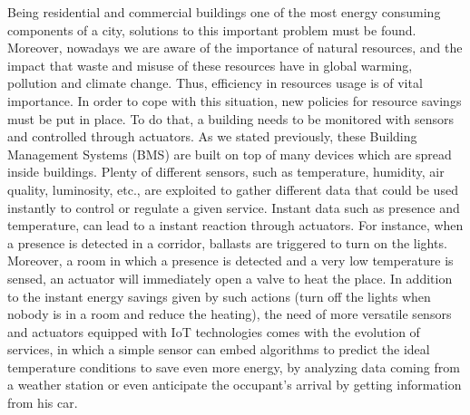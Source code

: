 Being residential and commercial buildings one of the most energy consuming components\cite{perez2008review} of a city, solutions to this important problem must be found.
Moreover, nowadays we are aware of the importance of natural resources, and the impact that waste and misuse of these resources have in global warming, pollution and climate change.
Thus, efficiency in resources usage is of vital importance.
In order to cope with this situation, new policies for resource savings must be put in place.
To do that, a building needs to be monitored with sensors and controlled through actuators.
As we stated previously, these Building Management Systems (BMS) are built on top of many devices which are spread inside buildings.
Plenty of different sensors, such as temperature, humidity, air quality, luminosity, etc., are exploited to gather different data that could be used instantly to control or regulate a given service.
Instant data such as presence and temperature, can lead to a instant reaction through actuators.
For instance, when a presence is detected in a corridor, ballasts are triggered to turn on the lights.
Moreover, a room in which a presence is detected and a very low temperature is sensed, an actuator will immediately open a valve to heat the place.
In addition to the instant energy savings given by such actions (turn off the lights when nobody is in a room and reduce the heating), the need of more versatile sensors and actuators equipped with IoT technologies comes with the evolution of services, in which a simple sensor can embed algorithms to predict the ideal temperature conditions to save even more energy, by analyzing data coming from a weather station or even anticipate the occupant's arrival by getting information from his car.

